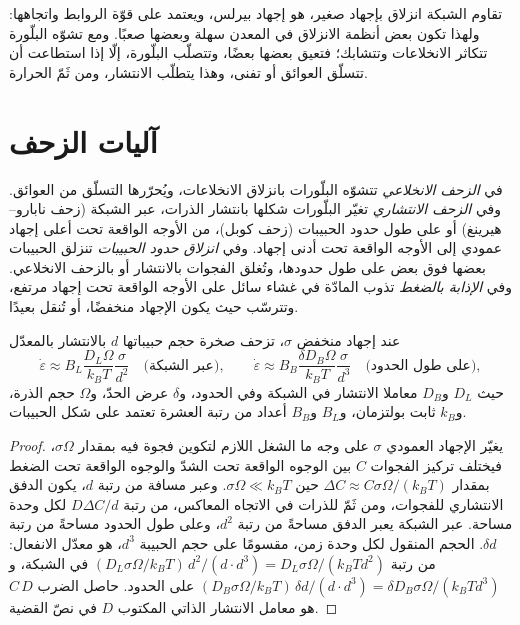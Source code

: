 تقاوم الشبكة انزلاق  بإجهاد صغير، هو
إجهاد بيرلس، ويعتمد على قوّة الروابط واتجاهها:
ولهذا تكون بعض أنظمة الانزلاق في المعدن سهلة وبعضها صعبًا. ومع
تشوّه البلّورة تتكاثر الانخلاعات وتتشابك؛ فتعيق بعضها بعضًا،
وتتصلّب البلّورة، إلّا إذا استطاعت أن تتسلّق العوائق أو تفنى، وهذا
يتطلّب الانتشار، ومن ثَمّ الحرارة.

\section{آليات الزحف}

\begin{definition}\label{def:b3:deformation-mechanisms:creep}
في \emph{الزحف الانخلاعي} تتشوّه البلّورات بانزلاق
الانخلاعات، ويُحرّرها التسلّق من العوائق. وفي
\emph{الزحف الانتشاري} تغيّر البلّورات شكلها بانتشار الذرات،
عبر الشبكة (زحف نابارو--هيرينغ) أو على طول
حدود الحبيبات (زحف كوبل)، من الأوجه الواقعة تحت أعلى إجهاد عمودي
إلى الأوجه الواقعة تحت أدنى إجهاد. وفي \emph{انزلاق حدود الحبيبات}
تنزلق الحبيبات بعضها فوق بعض على طول حدودها، وتُغلق الفجوات
بالانتشار أو بالزحف الانخلاعي. وفي \emph{الإذابة
بالضغط} تذوب المادّة في غشاء سائل على الأوجه
الواقعة تحت إجهاد مرتفع، وتترسّب حيث يكون الإجهاد منخفضًا، أو تُنقل
بعيدًا.
\end{definition}

\begin{proposition}\label{prop:b3:deformation-mechanisms:grain-size}
عند إجهاد منخفض $\sigma$، تزحف صخرة حجم حبيباتها $d$ بالانتشار بالمعدّل
\[
  \dot\varepsilon \approx B_L\frac{D_L\Omega}{k_BT}\frac{\sigma}{d^2}
  \quad\text{(عبر الشبكة)},\qquad
  \dot\varepsilon \approx B_B\frac{\delta D_B\Omega}{k_BT}\frac{\sigma}{d^3}
  \quad\text{(على طول الحدود)},
\]
حيث $D_L$ و$D_B$ معاملا الانتشار في الشبكة وفي
الحدود، و$\delta$ عرض الحدّ، و$\Omega$ حجم الذرة،
و$k_B$ ثابت بولتزمان، و$B_L$ و$B_B$ أعداد من رتبة العشرة تعتمد على
شكل الحبيبات.
\end{proposition}

\begin{proof}
يغيّر الإجهاد العمودي $\sigma$ على وجه ما الشغل اللازم لتكوين فجوة فيه
بمقدار $\sigma\Omega$، فيختلف تركيز الفجوات $C$ بين
الوجوه الواقعة تحت الشدّ والوجوه الواقعة تحت الضغط بمقدار $\Delta C \approx C\sigma\Omega/
(k_BT)$ حين $\sigma\Omega \ll k_BT$. وعبر مسافة من رتبة $d$، يكون
الدفق الانتشاري للفجوات، ومن ثَمّ للذرات في الاتجاه المعاكس، من رتبة $D\Delta
C/d$ لكل وحدة مساحة. عبر الشبكة يعبر الدفق مساحةً من رتبة
$d^2$، وعلى طول الحدود مساحةً من رتبة $\delta d$. الحجم المنقول لكل
وحدة زمن، مقسومًا على حجم الحبيبة $d^3$، هو معدّل الانفعال: من رتبة
$(D_L\sigma\Omega/k_BT)\,d^2/(d\cdot d^3) = D_L\sigma\Omega/(k_BTd^2)$ في
الشبكة، و$(D_B\sigma\Omega/k_BT)\,\delta d/(d\cdot d^3) = \delta D_B
\sigma\Omega/(k_BTd^3)$ على الحدود. حاصل الضرب $C\,D$ هو معامل
الانتشار الذاتي المكتوب $D$ في نصّ القضية.
\end{proof}

